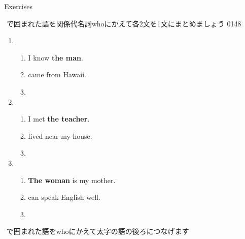 \documentclass[aspectratio=169,xcolor={dvipsnames,table}]{beamer}
\begin{document}
\begin{frame}[plain,t]{Exercises}

{\small \fbox{　　}\,\,で囲まれた語を関係代名詞whoにかえて各2文を1文にまとめましょう}%
\hfill{\tiny 0148}\,{\scriptsize {}}
\begin{enumerate}
 \item \begin{enumerate}
	\item I know {\bfseries the man}.
	\item {} came from Hawaii.
	\item {}
       \end{enumerate}
 \item \begin{enumerate}
	\item I met {\bfseries the teacher}.
	\item {} lived near my house.
	\item {}
       \end{enumerate}
 \item \begin{enumerate}
	\item {\bfseries The woman} is my mother.
	\item {} can speak English well.
	\item {}
       \end{enumerate}
\end{enumerate} 

\vspace{30pt}

\hfill{\small \fbox{　　}\,\,で囲まれた語をwhoにかえて太字の語の後ろにつなげます}
\end{frame}
\end{document}
